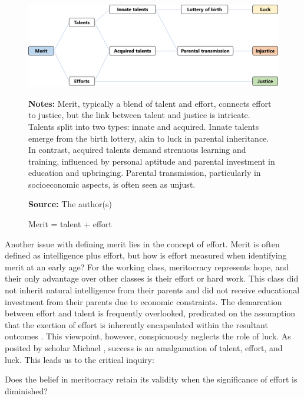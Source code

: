 \begin{figure}[h!]
	\centering
	\includegraphics[width=0.9\linewidth]{figs/fig1}
	\caption{Merit = talent + effort}
	\label{fig:fig1}
	\begin{minipage}{1\linewidth}
		\vspace{0.2cm}
		\footnotesize
		\textbf{Notes:} Merit, typically a blend of talent and effort, connects effort to justice, but the link between talent and justice is intricate. Talents split into two types: innate and acquired. Innate talents emerge from the birth lottery, akin to luck in parental inheritance. In contrast, acquired talents demand strenuous learning and training, influenced by personal aptitude and parental investment in education and upbringing. Parental transmission, particularly in socioeconomic aspects, is often seen as unjust.
		
		\textbf{Source:} The author(s)
	\end{minipage}
\end{figure}

Another issue with defining merit lies in the concept of effort. Merit is often defined as intelligence plus effort, but how is effort measured when identifying merit at an early age? For the working class, meritocracy represents hope, and their only advantage over other classes is their effort or hard work. This class did not inherit natural intelligence from their parents and did not receive educational investment from their parents due to economic constraints. The demarcation between effort and talent is frequently overlooked, predicated on the assumption that the exertion of effort is inherently encapsulated within the resultant outcomes \citep{dunlosky2020role}. This viewpoint, however, conspicuously neglects the role of luck. As posited by scholar Michael \citet{shermer2017secret}, success is an amalgamation of talent, effort, and luck. This leads us to the critical inquiry:

\begin{question} \label{q1}
	Does the belief in meritocracy retain its validity when the significance of effort is diminished?
\end{question}

